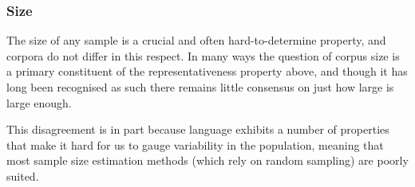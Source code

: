 % 
% 
% 











\subsubsection{Size}

The size of any sample is a crucial and often hard-to-determine property, and corpora do not differ in this respect.  In many ways the question of corpus size is a primary constituent of the representativeness property above, and though it has long been recognised as such there remains little consensus on just how large is large enough.

This disagreement is in part because language exhibits a number of properties that make it hard for us to gauge variability in the population, meaning that most sample size estimation methods (which rely on random sampling) are poorly suited.

